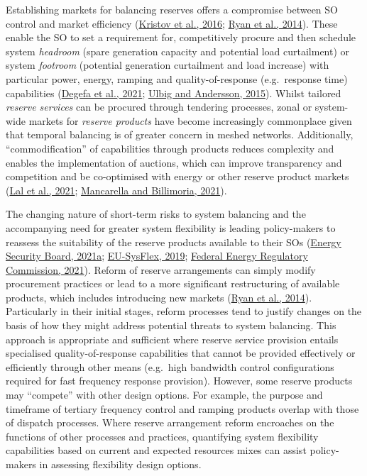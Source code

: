 \documentclass[12pt,a4paper,]{report}
\begin{document}
Establishing markets for balancing reserves offers a compromise between
SO control and market efficiency
(\protect\hyperlink{ref-kristovTaleTwoVisions2016}{Kristov et al.,
2016}; \protect\hyperlink{ref-ryanVariableGenerationReserves2014}{Ryan
et al., 2014}). These enable the SO to set a requirement for,
competitively procure and then schedule system \emph{headroom} (spare
generation capacity and potential load curtailment) or system
\emph{footroom} (potential generation curtailment and load increase)
with particular power, energy, ramping and quality-of-response
(e.g.~response time) capabilities
(\protect\hyperlink{ref-degefaComprehensiveClassificationsCharacterizations2021}{Degefa
et al., 2021};
\protect\hyperlink{ref-ulbigAnalyzingOperationalFlexibility2015}{Ulbig
and Andersson, 2015}). Whilst tailored \emph{reserve services} can be
procured through tendering processes, zonal or system-wide markets for
\emph{reserve products} have become increasingly commonplace given that
temporal balancing is of greater concern in meshed networks.
Additionally, ``commodification'' of capabilities through products
reduces complexity and enables the implementation of auctions, which can
improve transparency and competition and be co-optimised with energy or
other reserve product markets
(\protect\hyperlink{ref-lalEssentialSystemServices2021}{Lal et al.,
2021};
\protect\hyperlink{ref-mancarellaFragileGridPhysics2021}{Mancarella and
Billimoria, 2021}).

The changing nature of short-term risks to system balancing and the
accompanying need for greater system flexibility is leading
policy-makers to reassess the suitability of the reserve products
available to their SOs
(\protect\hyperlink{ref-energysecurityboardPost2025Market2021}{Energy
Security Board, 2021a};
\protect\hyperlink{ref-eu-sysflexProductDefinitionInnovative2019}{EU-SysFlex,
2019};
\protect\hyperlink{ref-federalenergyregulatorycommissionEnergyAncillaryServices2021}{Federal
Energy Regulatory Commission, 2021}). Reform of reserve arrangements can
simply modify procurement practices or lead to a more significant
restructuring of available products, which includes introducing new
markets (\protect\hyperlink{ref-ryanVariableGenerationReserves2014}{Ryan
et al., 2014}). Particularly in their initial stages, reform processes
tend to justify changes on the basis of how they might address potential
threats to system balancing. This approach is appropriate and sufficient
where reserve service provision entails specialised quality-of-response
capabilities that cannot be provided effectively or efficiently through
other means (e.g.~high bandwidth control configurations required for
fast frequency response provision). However, some reserve products may
``compete'' with other design options. For example, the purpose and
timeframe of tertiary frequency control and ramping products overlap
with those of dispatch processes. Where reserve arrangement reform
encroaches on the functions of other processes and practices,
quantifying system flexibility capabilities based on current and
expected resources mixes can assist policy-makers in assessing
flexibility design options.
\end{document}
